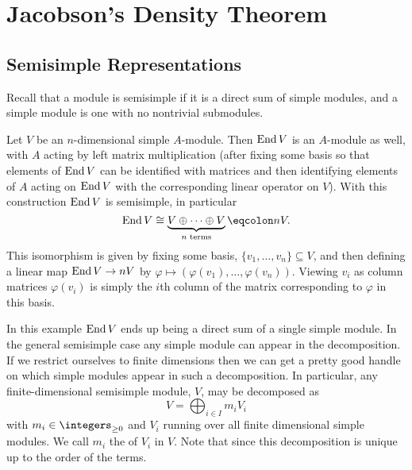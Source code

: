 \chapter{Jacobson's Density Theorem}
\section{Semisimple Representations}
Recall that a module is semisimple if it is a direct sum of simple modules, and a simple module is one with no nontrivial submodules.

\begin{exm}{}{}
    Let \(V\) be an \(n\)-dimensional simple \(A\)-module.
    Then \(\operatorname{End} V\) is an \(A\)-module as well, with \(A\) acting by left matrix multiplication (after fixing some basis so that elements of \(\operatorname{End} V\) can be identified with matrices and then identifying elements of \(A\) acting on \(\operatorname{End} V\) with the corresponding linear operator on \(V\)).
    With this construction \(\operatorname{End} V\) is semisimple, in particular
    \begin{equation}
        \End V \isomorphic \underbrace{V \oplus \dotsb \oplus V}_{n \text{ terms}} \eqcolon nV.
    \end{equation}
    This isomorphism is given by fixing some basis, \(\{v_1, \dotsc, v_n\} \subseteq V\), and then defining a linear map \(\operatorname{End} V \to nV\) by \(\varphi \mapsto (\varphi(v_1), \dotsc, \varphi(v_n))\).
    Viewing \(v_i\) as column matrices \(\varphi(v_i)\) is simply the \(i\)th column of the matrix corresponding to \(\varphi\) in this basis.
\end{exm}

In this example \(\operatorname{End} V\) ends up being a direct sum of a single simple module.
In the general semisimple case any simple module can appear in the decomposition.
If we restrict ourselves to finite dimensions then we can get a pretty good handle on which simple modules appear in such a decomposition.
In particular, any finite-dimensional semisimple module, \(V\), may be decomposed as
\begin{equation}
    V = \bigoplus_{i \in I} m_i V_i
\end{equation}
with \(m_i \in \integers_{\ge 0}\) and \(V_i\) running over all finite dimensional simple modules.
We call \(m_i\) the  of \(V_i\) in \(V\).
Note that since this decomposition is unique up to the order of the terms.

